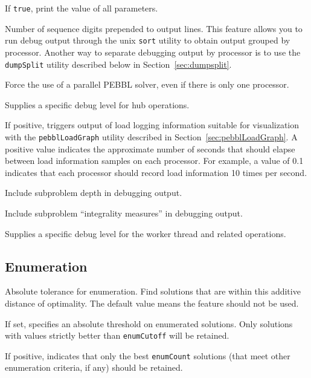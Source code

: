If \texttt{true}, print the value of all parameters.

Number of sequence digits prepended to output lines.  This feature
allows you to run debug output through the unix \texttt{sort} utility
to obtain output grouped by processor.  Another way to separate
debugging output by processor is to use the \texttt{dumpSplit} 
utility described below in Section~\ref{sec:dumpsplit}.

 Force the use of a parallel PEBBL
solver, even if there is only one processor.  

Supplies a specific debug level for hub operations.

 If positive, triggers output of
load logging information suitable for visualization with the 
\texttt{pebblLoadGraph} utility described in
Section~\ref{sec:pebblLoadGraph}.  A positive value indicates the
approximate number of seconds that should elapse between load information
samples on each processor.  For example, a value of 0.1 indicates that
each processor should record load information 10 times per second.

Include subproblem depth in debugging output.

Include subproblem ``integrality measures'' in debugging output.

Supplies a specific debug level for the worker thread and related operations.


\subsection{Enumeration}
\vspace{-3ex}
Absolute tolerance for enumeration.  Find solutions
that are within this additive distance of optimality.  The default
value means the feature should not be used.

If set, specifies an absolute threshold on enumerated solutions.  Only
solutions with values strictly better than \texttt{enumCutoff} will be
retained. 

        If positive, indicates that only the best \texttt{enumCount}
        solutions (that meet other enumeration criteria, if any)
        should be retained. 

